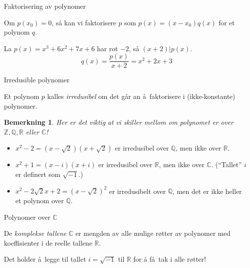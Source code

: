 \documentclass[norsk, handout]{beamer}
\theoremstyle{example}
\newtheorem{remark}{Bemerkning}
\begin{document}
\begin{frame}{Faktorisering av polynomer}
    \begin{lemma}
        Om $p(x_0) = 0$, så kan vi faktorisere $p$ som $p(x) = (x - x_0)q(x)$
        for et polynom $q$.
    \end{lemma}
    \pause
    \begin{example}
        La $p(x) = x^3 + 6x^2 + 7x + 6$ har rot $-2$,
        så $(x + 2) | p(x)$.
        \[
            q(x) = \frac {p(x)}{x + 2} = x^2 + 2x + 3
        \]
    \end{example}
\end{frame}

\begin{frame}{Irredusible polynomer}
    \begin{definition}
        Et polynom $p$ kalles \textit{irredusibel} om det går an å faktorisere i
        (ikke-konstante) polynomer.
    \end{definition}
    \begin{remark}
        Her er det viktig at vi skiller mellom om polynomet er over
        $\mathbb Z,\mathbb Q, \mathbb R$ eller $\mathbb C$!
    \end{remark}
    \pause
    \begin{example}
        \begin{itemize}
            \item $x^2 - 2 = (x - \sqrt 2)(x + \sqrt 2)$ er irredusibel over $\mathbb Q$,
                men ikke over $\mathbb R$.
            \item $x^2 + 1 = (x - i)(x + i)$ er irredusibel over $\mathbb R$,
                men ikke over $\mathbb C$. (``Tallet'' $i$ er definert som $\sqrt {-1}$.)
            \item $x^2 - 2\sqrt 2 x + 2 = {(x - \sqrt 2)}^2$ er irredusibelt over $\mathbb Q$,
                men det er ikke heller et polynom over $\mathbb Q$.
        \end{itemize}
    \end{example}
\end{frame}

\begin{frame}{Polynomer over $\mathbb C$}
    \begin{definition}
        De \textit{komplekse tallene} $\mathbb C$ er mengden av
        alle mulige røtter av polynomer med koeffisienter i
        de reelle tallene $\mathbb R$.
    \end{definition}
    \begin{fact}
        Det holder å legge til tallet $i = \sqrt{-1}$ til $\mathbb R$ for å
        få tak i alle røtter!
    \end{fact}
\end{frame}
\end{document}
